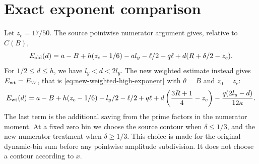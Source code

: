 \documentclass[11pt]{article}
\begin{document}


\section{Exact exponent comparison}\label{sec:new-certificate}

Let $z_c=17/50$. The source pointwise numerator argument gives, relative
to $C(B)$,
\begin{equation}\label{eq:old-high-new-geometry}
 E_{\rm old}(d)=a-B+h(z_c-1/6)-a l_y-\ell/2+q\ell
                  +d(R+\delta/2-z_c).
\end{equation}
For $1/2\le d\le h$, we have $l_y<d<2l_y$. The new weighted estimate
instead gives $E_{\rm wt}=E_W$, that is \eqref{eq:new-weighted-high-exponent}
with $\theta=B$ and $z_0=z_c$:
\begin{equation}\label{eq:weighted-high}
 E_{\rm wt}(d)=a-B+h(z_c-1/6)-l_y/2-\ell/2+q\ell
       +d\left(\frac{3R+1}{4}-z_c\right)
       -\frac{q(2l_y-d)}{12\kappa}.
\end{equation}
The last term is the additional saving from the prime factors in the
numerator moment. At a fixed zero bin we choose the source contour when
$\delta\le1/3$, and the new numerator treatment when $\delta\ge1/3$.
This choice is made for the original dynamic-bin sum before any pointwise
amplitude subdivision. It does not choose a contour according to $x$.
\end{document}
